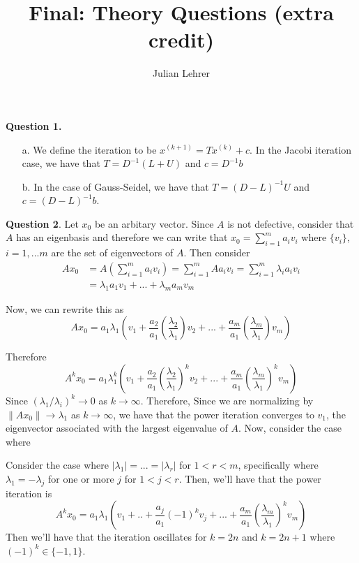 \documentclass{article}
\title{Final: Theory Questions (extra credit)}
\date{}
\author{Julian Lehrer}
\newcommand{\ra}{\longrightarrow}
\begin{document}
\maketitle

\textbf{Question 1.}
\begin{itemize}
    \item[a.] We define the iteration to be $x^{(k+1)} = Tx^{(k)} + c$. In the Jacobi iteration case, we have that $T=D^{-1}(L+U)$ and $c=D^{-1}b$
    \item[b.] In the case of Gauss-Seidel, we have that $T=(D-L)^{-1}U$ and $c=(D-L)^{-1}b$. 
\end{itemize}

\textbf{Question 2}. Let $x_0$ be an arbitary vector. Since $A$ is not defective, consider that $A$ has an eigenbasis and therefore we can write that $x_0 = \sum_{i=1}^m a_iv_i$ where $\{v_i\}$, $i=1,...m$ are the set of eigenvectors of $A$. Then consider 
\begin{align*}
    Ax_0 &= A\left(\sum_{i=1}^m a_iv_i\right) = \sum_{i=1}^m Aa_i v_i = \sum_{i=1}^m \lambda_i a_i v_i\\
    &= \lambda_1a_1v_1+...+\lambda_m a_m v_m 
\end{align*}

Now, we can rewrite this as 
\begin{equation*}
    Ax_0 = a_1\lambda_1\left(v_1+\frac{a_2}{a_1}\left(\frac{\lambda_2}{\lambda_1}\right)v_2+...+\frac{a_m}{a_1}\left(\frac{\lambda_m}{\lambda_1}\right)v_m\right)
\end{equation*}

Therefore 
\begin{equation*}
    A^{k}x_0 = a_1\lambda_1^k\left(v_1+\frac{a_2}{a_1}\left(\frac{\lambda_2}{\lambda_1}\right)^kv_2+...+\frac{a_m}{a_1}\left(\frac{\lambda_m}{\lambda_1}\right)^kv_m\right)
\end{equation*}
Since $\left(\lambda_1/\lambda_i\right)^k \ra 0$ as $k \ra \infty$. Therefore, Since we are normalizing by $\|Ax_0\| \ra \lambda_1$ as $k \ra \infty$, we have that the power iteration converges to $v_1$, the eigenvector associated with the largest eigenvalue of $A$. Now, consider the case where 

Consider the case where $|\lambda_1| =...=|\lambda_r|$ for $1 < r < m$, specifically where $\lambda_1 = -\lambda_j$ for one or more $j$ for $1 < j < r$. Then, we'll have that the power iteration is 
\begin{equation*}
    A^{k}x_0 = a_1\lambda_1\left(v_1+..+\frac{a_j}{a_1}\left(-1\right)^k v_j +... +\frac{a_m}{a_1}\left(\frac{\lambda_m}{\lambda_1}\right)^k v_m\right)
\end{equation*}
Then we'll have that the iteration oscillates for $k=2n$ and $k=2n+1$ where $(-1)^k \in \{-1, 1\}$. 
\end{document}
